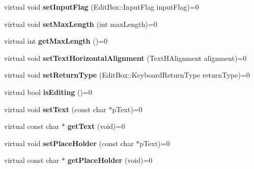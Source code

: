 \begin{DoxyCompactItemize}
virtual void {\bfseries set\+Input\+Flag} (Edit\+Box\+::\+Input\+Flag input\+Flag)=0
\item 
\mbox{\label{classcocos2d_1_1ui_1_1EditBoxImpl_a286be4fcc90d01033aeebc15f5721c01}} 
virtual void {\bfseries set\+Max\+Length} (int max\+Length)=0
\item 
\mbox{\label{classcocos2d_1_1ui_1_1EditBoxImpl_a8c3f9c93c0b14dedbed15e4dff599a92}} 
virtual int {\bfseries get\+Max\+Length} ()=0
\item 
\mbox{\label{classcocos2d_1_1ui_1_1EditBoxImpl_af5e3a2cc83c159d6cc224e6d7ddbfde2}} 
virtual void {\bfseries set\+Text\+Horizontal\+Alignment} (Text\+H\+Alignment alignment)=0
\item 
\mbox{\label{classcocos2d_1_1ui_1_1EditBoxImpl_a80bc8e5897f7cc1e3dc04f493865d982}} 
virtual void {\bfseries set\+Return\+Type} (Edit\+Box\+::\+Keyboard\+Return\+Type return\+Type)=0
\item 
\mbox{\label{classcocos2d_1_1ui_1_1EditBoxImpl_a26ef2dc6715eb1a03704442e6b3710a4}} 
virtual bool {\bfseries is\+Editing} ()=0
\item 
\mbox{\label{classcocos2d_1_1ui_1_1EditBoxImpl_a57d39d247bf3e505338a4aa239f23ad5}} 
virtual void {\bfseries set\+Text} (const char $\ast$p\+Text)=0
\item 
\mbox{\label{classcocos2d_1_1ui_1_1EditBoxImpl_ad32c337f7bc9d292fd70931414354d70}} 
virtual const char $\ast$ {\bfseries get\+Text} (void)=0
\item 
\mbox{\label{classcocos2d_1_1ui_1_1EditBoxImpl_a82ba9a8b8a522951f5186e904a299947}} 
virtual void {\bfseries set\+Place\+Holder} (const char $\ast$p\+Text)=0
\item 
\mbox{\label{classcocos2d_1_1ui_1_1EditBoxImpl_a1f0f97a47217443ce258225a9761c3ff}} 
virtual const char $\ast$ {\bfseries get\+Place\+Holder} (void)=0
\item 

\end{DoxyCompactItemize}
